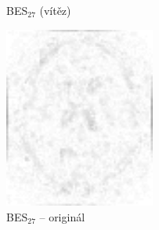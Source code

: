 \begin{figure}[H]
\begin{minipage}[l]{0.5\textwidth}
            \caption{BES$_{27}$ (vítěz)}
        \end{minipage}
        \begin{minipage}[r]{0.5\textwidth}
            \center
            \includegraphics[width = 140pt]{src/8Appendix/final/5-30besD.png}
            \caption{BES$_{27}$ -- originál}
        \end{minipage}
    \end{figure}
